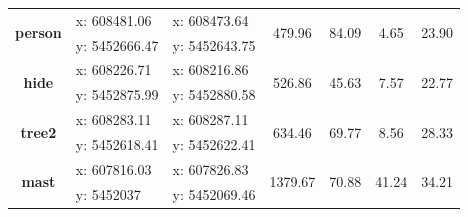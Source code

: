\begin{table}[!h]
\begin{tabular}{crrcccc}
		\multirow{2}[0]{*}{\textbf{person}} & \multicolumn{1}{l}{x: 608481.06} & \multicolumn{1}{l}{x: 608473.64} & \multirow{2}[0]{*}{479.96} & \multirow{2}[0]{*}{84.09} & \multirow{2}[0]{*}{4.65} & \multirow{2}[0]{*}{23.90} \\
		& \multicolumn{1}{l}{y: 5452666.47} & \multicolumn{1}{l}{y: 5452643.75} &       &       &       &  \\
		\multirow{2}[0]{*}{\textbf{hide}} & \multicolumn{1}{l}{x: 608226.71} & \multicolumn{1}{l}{x: 608216.86} & \multirow{2}[0]{*}{526.86} & \multirow{2}[0]{*}{45.63} & \multirow{2}[0]{*}{7.57} & \multirow{2}[0]{*}{22.77} \\
		& \multicolumn{1}{l}{y: 5452875.99} & \multicolumn{1}{l}{y: 5452880.58} &       &       &       &  \\
		\multirow{2}[0]{*}{\textbf{tree2}} & \multicolumn{1}{l}{x: 608283.11} & \multicolumn{1}{l}{x: 608287.11} & \multirow{2}[0]{*}{634.46} & \multirow{2}[0]{*}{69.77} & \multirow{2}[0]{*}{8.56} & \multirow{2}[0]{*}{28.33} \\
		& \multicolumn{1}{l}{y: 5452618.41} & \multicolumn{1}{l}{y: 5452622.41} &       &       &       &  \\
		\multirow{2}[0]{*}{\textbf{mast}} & \multicolumn{1}{l}{x: 607816.03} & \multicolumn{1}{l}{x: 607826.83} & \multirow{2}[0]{*}{1379.67} & \multirow{2}[0]{*}{70.88} & \multirow{2}[0]{*}{41.24} & \multirow{2}[0]{*}{34.21} \\
		& \multicolumn{1}{l}{y: 5452037} & \multicolumn{1}{l}{y: 5452069.46} &       &       &       &  \\
		\bottomrule
	\end{tabular}
	\label{tab:static_targets_zebetin}
\end{table}


